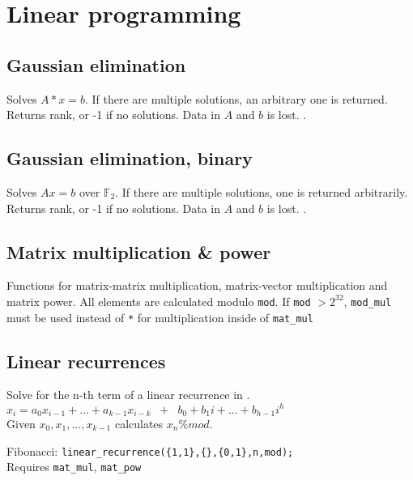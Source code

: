 \section{Linear programming}

\subsection{Gaussian elimination}
Solves $A * x = b$. If there are multiple solutions, an arbitrary one is returned. Returns rank, or -1 if no solutions. Data in $A$ and $b$ is lost. .

\subsection{Gaussian elimination, binary}
Solves $Ax = b$ over $\mathbb F_2$. If there are multiple solutions, one is returned arbitrarily. Returns rank, or -1 if no solutions. Data in $A$ and $b$ is lost. .

\subsection{Matrix multiplication \& power}
Functions for matrix-matrix multiplication, matrix-vector multiplication and matrix power. All elements are calculated modulo \verb|mod|. If \verb|mod| $> 2^{32}$, \verb|mod_mul| must be used instead of \verb|*| for multiplication inside of \verb|mat_mul|

\subsection{Linear recurrences}
Solve for the n-th term of a linear recurrence in .\\
$x_i = a_0 x_{i-1} + ... + a_{k-1} x_{i-k} \;\; + \;\; b_0 + b_1 i + ... + b_{h-1} i^h$ \\
Given $x_0, x_1, ..., x_{k-1}$ calculates $x_n \% mod$.

Fibonacci: \texttt{linear\_recurrence(\{1,1\},\{\},\{0,1\},n,mod);}\\
Requires \verb|mat_mul|, \verb|mat_pow|
